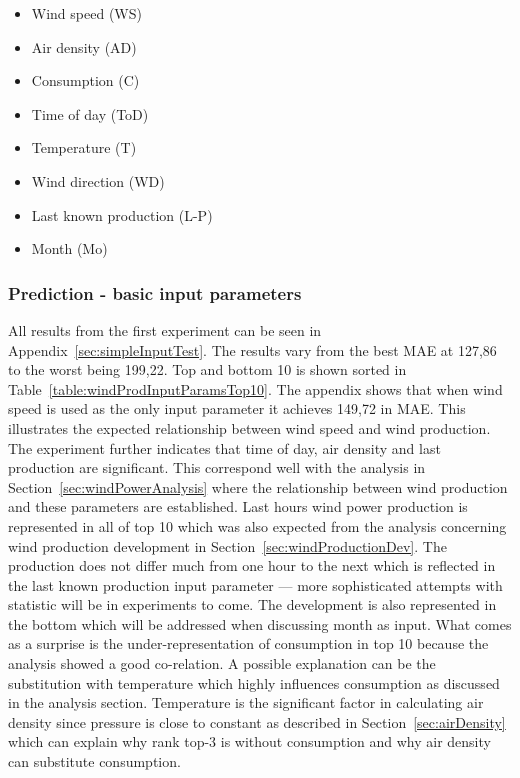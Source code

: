 \begin{itemize}
\item Wind speed (WS)
\item Air density (AD)
\item Consumption (C)
\item Time of day (ToD)
\item Temperature (T)
\item Wind direction (WD)
\item Last known production (L-P)
\item Month (Mo)
\end{itemize}

\subsubsection{Prediction - basic input parameters}
\label{sec:predictionBasicInputParams}
All results from the first experiment can be seen in Appendix~\ref{sec:simpleInputTest}. The results vary from the best MAE at 127,86 to the worst being 199,22. Top and bottom 10 is shown sorted in Table~\ref{table:windProdInputParamsTop10}. The appendix shows that when wind speed is used as the only input parameter it achieves 149,72 in MAE. This illustrates the expected relationship between wind speed and wind production. The experiment further indicates that time of day, air density and last production are significant. This correspond well with the analysis in Section~\ref{sec:windPowerAnalysis} where the relationship between wind production and these parameters are established. Last hours wind power production is represented in all of top 10 which was also expected from the analysis concerning wind production development in Section~\ref{sec:windProductionDev}. The production does not differ much from one hour to the next which is reflected in the last known production input parameter --- more sophisticated attempts with statistic will be in experiments to come. The development is also represented in the bottom which will be addressed when discussing month as input. What comes as a surprise is the under-representation of consumption in top 10 because the analysis showed a good co-relation. A possible explanation can be the substitution with temperature which highly influences consumption as discussed in the analysis section. Temperature is the significant factor in calculating air density since pressure is close to constant as described in Section~\ref{sec:airDensity} which can explain why rank top-3 is without consumption and why air density can substitute consumption.

